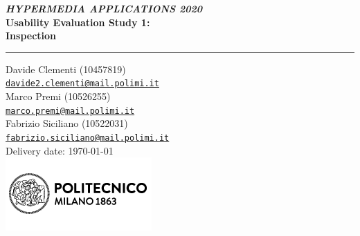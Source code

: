 \begin{titlepage}
	\begin{flushleft}
		\textit{\textbf{HYPERMEDIA APPLICATIONS 2020}}\\
		\vspace{0.8cm}
		{\Huge \bfseries \sffamily Usability Evaluation Study 1:\\Inspection}
		\vspace{0.8cm}
		\rule{\textwidth}{0.1cm} 
		\vspace{0.8cm}
	\end{flushleft} 
	\begin{center}
		Davide Clementi (10457819)\\[0cm]
		{\small \href{mailto:davide2.clementi@mail.polimi.it}{\texttt{davide2.clementi@mail.polimi.it}}}
		\\[0.5cm]
		Marco Premi (10526255)\\[0cm]
		{\small \href{mailto:marco.premi@mail.polimi.it}{\texttt{marco.premi@mail.polimi.it}}}
		\\[0.5cm]
		Fabrizio Siciliano (10522031)\\[0cm]
		{\small \href{mailto:fabrizio.siciliano@mail.polimi.it}{\texttt{fabrizio.siciliano@mail.polimi.it}}}\\
		\vspace{1.5cm} 
		Delivery date: \today\\[5ex] 
		\vspace{1cm}
		\vspace{1cm}
		\includegraphics{resources/images/logo_polimi.png}
	\end{center} 
\end{titlepage} 
\setcounter{page}{1} %